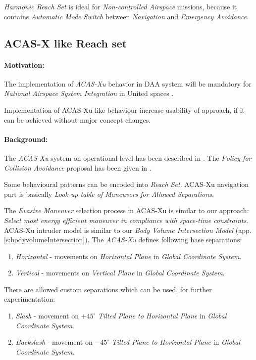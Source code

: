 \noindent \emph{Harmonic Reach Set} is ideal for \emph{Non-controlled Airspace} missions, because it contains \emph{Automatic Mode Switch} between \emph{Navigation} and \emph{Emergency Avoidance}.


\subsection{ACAS-X like Reach set}\label{s:acasReachSet}
\paragraph{Motivation:} The implementation of \emph{ACAS-Xu} behavior in DAA system will  be mandatory for \emph{National Airspace System Integration} in United spaces \cite{shively2018uas}. 

Implementation of ACAS-Xu like behaviour increase usability of approach, if it can be achieved without major concept changes.


\paragraph{Background:} The \emph{ACAS-Xu} system on operational level has been described in \cite{marston2015acas}. The \emph{Policy for Collision Avoidance} proposal has been given in \cite{julian2016policy}.

Some behavioural patterns can be encoded into  \emph{Reach Set}. ACAS-Xu navigation part is basically \emph{Look-up table of Maneuvers for Allowed Separations}.
 
The \emph{Evasive Maneuver} selection process in ACAS-Xu is similar to our approach: \emph{Select most energy efficient maneuver in compliance with space-time constraints}. ACAS-Xu intruder model is similar to our \emph{Body Volume Intersection Model} (app. \ref{s:bodyvolumeIntersection}). The \emph{ACAS-Xu} defines following base separations:

\begin{enumerate}
    \item \emph{Horizontal} - movements on \emph{Horizontal Plane} in \emph{Global Coordinate System}.
    
    \item \emph{Vertical} - movements on \emph{Vertical Plane} in \emph{Global Coordinate System}.
    
\end{enumerate}

\noindent There are allowed custom separations which can be used, for further experimentation: 
\begin{enumerate}
    \item \emph{Slash} - movement on $+45^{\circ}$ \emph{Tilted Plane to Horizontal Plane} in \emph{Global Coordinate System}.
    
    \item \emph{Backslash} - movement on $-45^{\circ}$ \emph{Tilted Plane to Horizontal Plane} in \emph{Global Coordinate System}.
    
\end{enumerate}

